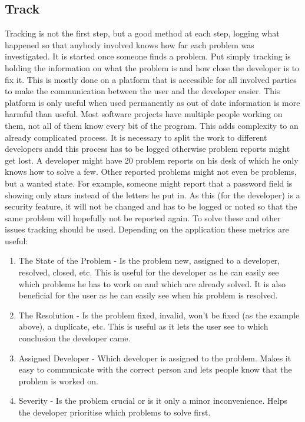 \subsection{Track}
\label{aodZellerTrack}
Tracking is not the first step, but a good method at each step, logging what happened so that anybody involved knows how far each problem was investigated. It is started once someone finds a problem. Put simply tracking is holding the information on what the problem is and how close the developer is to fix it. This is mostly done on a platform that is accessible for all involved parties to make the communication between the user and the developer easier. This platform is only useful when used permanently as out of date information is more harmful than useful. Most software projects have multiple people working on them, not all of them know every bit of the program. This adds complexity to an already complicated process. It is necessary to split the work to different developers andd this process has to be logged otherwise problem reports might get lost. A developer might have 20 problem reports on his desk of which he only knows how to solve a few. Other reported problems might not even be problems, but a wanted state. For example, someone might report that a password field is showing only stars instead of the letters he put in. As this (for the developer) is a security feature, it will not be changed and has to be logged or noted so that the same problem will hopefully not be reported again. To solve these and other issues tracking should be used. Depending on the application these metrics are useful:
\begin{enumerate}
  \item The State of the Problem - Is the problem new, assigned to a developer,
resolved, closed, etc. This is useful for the developer as he can easily see which problems he has to work on and which are already solved. It is also beneficial for the user as he can easily see when his problem is resolved.
  \item The Resolution - Is the problem fixed, invalid, won't be fixed (as the example above), a duplicate, etc. This is useful as it lets the user see to which conclusion the developer came.
  \item Assigned Developer -  Which developer is assigned to the problem. Makes it easy to communicate with the correct person and lets people know that the problem is worked on.
  \item Severity - Is the problem crucial or is it only a minor inconvenience. Helps the developer prioritise which problems to solve first.
\end{enumerate}

